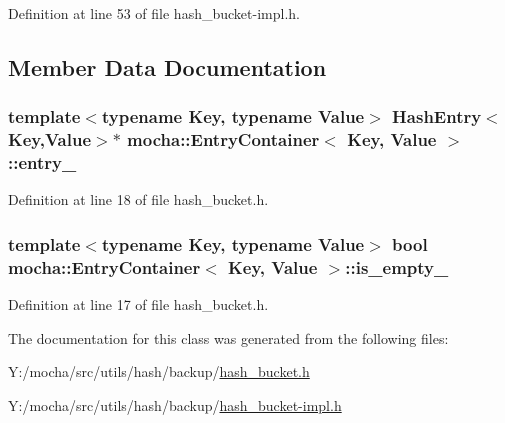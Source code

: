 Definition at line 53 of file hash\_\-bucket-\/impl.h.



\subsection{Member Data Documentation}
\hypertarget{classmocha_1_1_entry_container_ab8469685ebd4a1ad63d2086b50735207}{
\subsubsection[{entry\_\-}]{\setlength{\rightskip}{0pt plus 5cm}template$<$typename Key, typename Value$>$ {\bf HashEntry}$<$Key,Value$>$$\ast$ {\bf mocha::EntryContainer}$<$ Key, Value $>$::{\bf entry\_\-}}}
\label{classmocha_1_1_entry_container_ab8469685ebd4a1ad63d2086b50735207}


Definition at line 18 of file hash\_\-bucket.h.

\hypertarget{classmocha_1_1_entry_container_a4847640c605a8a387125bed78c608849}{
\subsubsection[{is\_\-empty\_\-}]{\setlength{\rightskip}{0pt plus 5cm}template$<$typename Key, typename Value$>$ bool {\bf mocha::EntryContainer}$<$ Key, Value $>$::{\bf is\_\-empty\_\-}}}
\label{classmocha_1_1_entry_container_a4847640c605a8a387125bed78c608849}


Definition at line 17 of file hash\_\-bucket.h.



The documentation for this class was generated from the following files:\begin{DoxyCompactItemize}
\item 
Y:/mocha/src/utils/hash/backup/\hyperlink{backup_2hash__bucket_8h}{hash\_\-bucket.h}\item 
Y:/mocha/src/utils/hash/backup/\hyperlink{hash__bucket-impl_8h}{hash\_\-bucket-\/impl.h}\end{DoxyCompactItemize}
